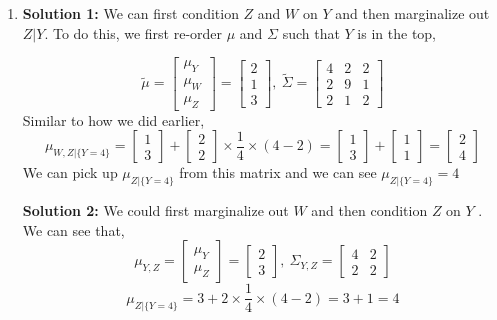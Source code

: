\documentclass[letterpaper]{article}
\begin{document}
\begin{enumerate}
  \item \textbf{Solution 1:} We can first condition $Z$ and $W$ on $Y$ and then marginalize out $Z|Y$. To do this, we first re-order $\mu$ and $\Sigma$ such that $Y$ is in the top, %

  $$ \tilde{\mu} = \begin{bmatrix} \mu_{Y} \\ \mu_W \\ \mu_{Z} \end{bmatrix} = \begin{bmatrix} 2 \\ 1 \\ 3 \end{bmatrix}, ~ \tilde{\Sigma} = \begin{bmatrix} 4 & 2 &2  \\ 2 & 9 & 1 \\ 2 & 1 &2 \end{bmatrix}$$
 Similar to how we did earlier,
 $$\mu_{W,Z|\{Y=4\}} = \begin{bmatrix} 1 \\3  \end{bmatrix} + \begin{bmatrix} 2 \\2  \end{bmatrix}\times \frac{1}{4} \times (4 - 2 ) = \begin{bmatrix} 1 \\3  \end{bmatrix} + \begin{bmatrix} 1 \\ 1  \end{bmatrix} = \begin{bmatrix} 2 \\4  \end{bmatrix}$$
 We can pick up $\mu_{Z|\{Y=4\}}$ from this matrix and we can see $\mu_{Z|\{Y=4\}} = 4$

      \newpage

      \textbf{Solution 2:} We could first marginalize out $W$ and then condition $Z$ on $Y$ . We can see that,
       $$\mu_{Y, Z} = \begin{bmatrix} \mu_{Y} \\ \mu_{Z} \end{bmatrix} = \begin{bmatrix} 2 \\ 3 \end{bmatrix}, ~\Sigma_{Y, Z} = \begin{bmatrix} 4 & 2 \\ 2 & 2 \end{bmatrix}$$
       $$\mu_{Z|\{Y=4\}} = 3 + 2 \times \frac{1}{4} \times (4 - 2) = 3 + 1 = 4 $$
\newpage
\end{enumerate}
\end{document}
